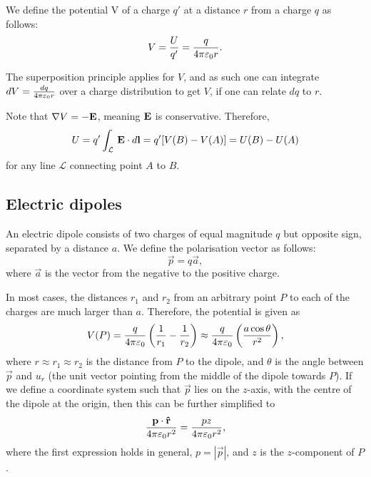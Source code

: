     
    We define the potential V of a charge $q'$ at a distance $r$ from a charge $q$ as follows: 
    \begin{equation}
        V = \frac{U}{q'} = \frac{q}{4\pi\varepsilon_0 r}.
    \end{equation}
    
    The superposition principle applies for $V$, and as such one can integrate $dV = \frac{dq}{4\pi\varepsilon_0 r}$ over a charge distribution to get $V$, 
    if one can relate $dq$ to $r$.

    Note that $\nabla V = -\mathbf{E}$, meaning $\mathbf{E}$ is conservative. Therefore, 
    \begin{equation}
        U = q'\int_\mathcal{L}\,\mathbf{E}\cdot d\mathbf{l} = q'[V(B) - V(A)] = U(B) - U(A)
    \end{equation}
    for any line $\mathcal{L}$ connecting point $A$ to $B$.

\subsection{Electric dipoles}
    An electric dipole consists of two charges of equal magnitude $q$ but opposite sign, separated by a distance $a$. 
    We define the polarisation vector as follows: 
    \begin{equation}
        \vec{p} = q\vec{a},
    \end{equation}
    where $\vec{a}$ is the vector from the negative  to the positive charge. 
    
    In most cases, the distances $r_1$ and $r_2$ from an arbitrary point $P$ to each of the charges are much larger than $a$. 
    Therefore, the potential is given as 
    \begin{equation}
        V(P) = \frac{q}{4\pi\varepsilon_0}\left( \frac{1}{r_1}-\frac{1}{r_2}\right) \approx 
        \frac{q}{4\pi\varepsilon_0}\left(\frac{a\cos\theta}{r^2}\right),
    \end{equation}
    where $r \approx r_1 \approx r_2$ is the distance from $P$ to the dipole, and $\theta$ is the angle between $\vec{p}$ and $u_r$ 
    (the unit vector pointing from the middle of the dipole towards $P$). 
    If we define a coordinate system such that $\vec{p}$ lies on the $z$-axis, 
    with the centre of the dipole at the origin, then this can be further simplified to
    \begin{equation}
        \frac{\vec{p}\cdot \hat{r}}{4\pi\e r^2} = \frac{pz}{4\pi\e r^2},
    \end{equation}
    where the first expression holds in general, $p = |\vec{p}|$, and $z$ is the $z$-component of $P$.
    
